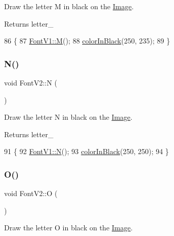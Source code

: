 Draw the letter M in black on the \mbox{\hyperlink{class_image}{Image}}. 

\begin{DoxyReturn}{Returns}
letter\+\_\+ 
\end{DoxyReturn}

\begin{DoxyCode}
86                \{
87     \mbox{\hyperlink{class_font_v1_a69afdf545ed6bccbb31efaef5d6d4219}{FontV1::M}}();
88     \mbox{\hyperlink{class_font_v2_a04f2501961bc286ce70fbb6a840b0e8a}{colorInBlack}}(250, 235);
89 \}
\end{DoxyCode}
\mbox{\label{class_font_v2_ab0f1cbe6375f24c45f6d9bd518165353}} 
\subsubsection{\texorpdfstring{N()}{N()}}
{\footnotesize\ttfamily void Font\+V2\+::N (\begin{DoxyParamCaption}{ }\end{DoxyParamCaption})}



Draw the letter N in black on the \mbox{\hyperlink{class_image}{Image}}. 

\begin{DoxyReturn}{Returns}
letter\+\_\+ 
\end{DoxyReturn}

\begin{DoxyCode}
91                \{
92     \mbox{\hyperlink{class_font_v1_a725c93ea00d851ca5b43c0d594f1d6d0}{FontV1::N}}();
93     \mbox{\hyperlink{class_font_v2_a04f2501961bc286ce70fbb6a840b0e8a}{colorInBlack}}(250, 250);
94 \}
\end{DoxyCode}
\mbox{\label{class_font_v2_afb1d85a50e3982f0f1e77d5e1ca7f53c}} 
\subsubsection{\texorpdfstring{O()}{O()}}
{\footnotesize\ttfamily void Font\+V2\+::O (\begin{DoxyParamCaption}{ }\end{DoxyParamCaption})}



Draw the letter O in black on the \mbox{\hyperlink{class_image}{Image}}. 

